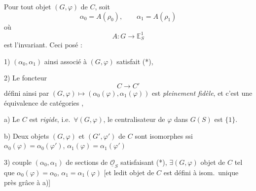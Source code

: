\documentclass[11pt,a4paper]{article}
\begin{document}
Pour tout objet $(G, \varphi)$ de $C$, soit
\[
\alpha_0 = A(\rho_0), \qquad \alpha_1 = A(\rho_1)
\]
où
\[
A : G \longrightarrow \mathbb{E}^1_S
\]
est l'invariant.  Ceci posé :

1) $(\alpha_0, \alpha_1)$ ainsi associé à $(G, \varphi)$ satisfait (*),

2) Le foncteur
\[
C \longrightarrow C'
\]
défini ainsi par $(G, \varphi) \longmapsto (\alpha_0(\varphi), \alpha_1(\varphi))$
est \emph{pleinement fidèle}, et c'est une équivalence de catégories
,

a) Le  $C$ est \emph{rigide}, i.e.\ $\forall (G, \varphi)$, le
centralisateur de $\varphi$ dans $G(S)$ est $\lbrace 1 \rbrace$.

b) Deux objets $(G, \varphi)$ et $(G', \varphi')$ de $C$ sont isomorphes ssi
$\alpha_0(\varphi) = \alpha_0(\varphi')$, $\alpha_1(\varphi) = \alpha_1(\varphi')$

3) \struck{$\forall$}  couple $(\alpha_0, \alpha_1)$
\struck{\ill{}} de sections de $\underline{\mathcal{O}}_S$ satisfaisant (*),
$\exists (G, \varphi)$ \struck{\ill{}} objet de $C$ tel que
$\alpha_0(\varphi) = \alpha_0$, $\alpha_1 = \alpha_1(\varphi)$ [et ledit objet
de $C$ est défini à isom.\ unique près grâce à a)]

\end{document}
